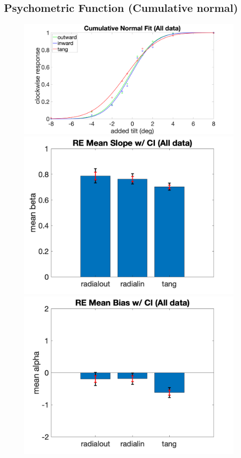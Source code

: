\documentclass[11pt]{article} %
\begin{document}
\subsection{Psychometric Function (Cumulative normal)}
\begin{figure}[H]
\centering %
\includegraphics[scale=.06]{Images/PF_cardobl.png}
\includegraphics[scale=.11]{Images/MeanSlopeError_cardobl.png}
\includegraphics[scale=.11]{Images/MeanBiasError_cardobl.png}

\end{figure}
\end{document}
